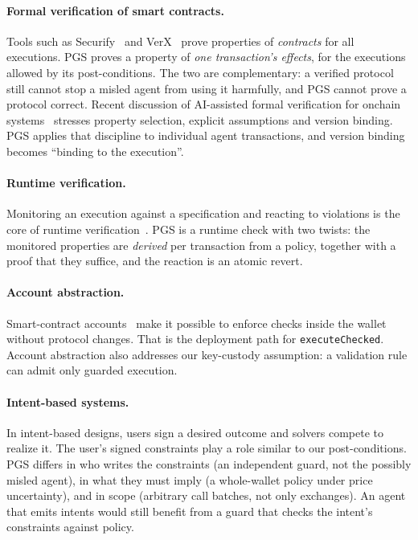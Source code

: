 \documentclass[11pt]{article}
\newcommand{\pgs}{\textsc{PGS}}
\begin{document}
\paragraph{Formal verification of smart contracts.} Tools such as Securify~\cite{tsankov2018securify} and VerX~\cite{permenev2020verx} prove properties of \emph{contracts} for all executions. \pgs{} proves a property of \emph{one transaction's effects}, for the executions allowed by its post-conditions. The two are complementary: a verified protocol still cannot stop a misled agent from using it harmfully, and \pgs{} cannot prove a protocol correct. Recent discussion of AI-assisted formal verification for onchain systems~\cite{buterin2026fv,sherlock2026fv} stresses property selection, explicit assumptions and version binding. \pgs{} applies that discipline to individual agent transactions, and version binding becomes ``binding to the execution''.

\paragraph{Runtime verification.} Monitoring an execution against a specification and reacting to violations is the core of runtime verification~\cite{leucker2009brief}. \pgs{} is a runtime check with two twists: the monitored properties are \emph{derived} per transaction from a policy, together with a proof that they suffice, and the reaction is an atomic revert.

\paragraph{Account abstraction.} Smart-contract accounts~\cite{erc4337} make it possible to enforce checks inside the wallet without protocol changes. That is the deployment path for \texttt{executeChecked}. Account abstraction also addresses our key-custody assumption: a validation rule can admit only guarded execution.

\paragraph{Intent-based systems.} In intent-based designs, users sign a desired outcome and solvers compete to realize it. The user's signed constraints play a role similar to our post-conditions. \pgs{} differs in who writes the constraints (an independent guard, not the possibly misled agent), in what they must imply (a whole-wallet policy under price uncertainty), and in scope (arbitrary call batches, not only exchanges). An agent that emits intents would still benefit from a guard that checks the intent's constraints against policy.
\end{document}
